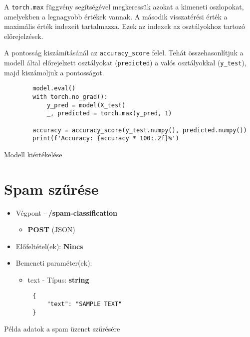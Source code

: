 \newpage
\begin{flushleft}
    A \verb|torch.max| függvény segítségével megkeressük azokat a kimeneti oszlopokat, amelyekben a legnagyobb értékek vannak. A második visszatérési érték a maximális érték indexeit tartalmazza. Ezek az indexek az osztályokhoz tartozó előrejelzések.
\end{flushleft}
\begin{flushleft}
    A pontosság kiszámításánál az \verb|accuracy_score| felel. Tehát összehasonlítjuk a modell által előrejelzett osztályokat (\verb|predicted|) a valós osztályokkal (\verb|y_test|), majd kiszámoljuk a pontosságot.
\end{flushleft}
\begin{listing}[H]
    \begin{verbatim}
        model.eval()
        with torch.no_grad():
            y_pred = model(X_test)
            _, predicted = torch.max(y_pred, 1)

        accuracy = accuracy_score(y_test.numpy(), predicted.numpy())
        print(f'Accuracy: {accuracy * 100:.2f}%')
    \end{verbatim}
    \caption{Modell kiértékelése}
    \label{code:eval}
\end{listing}

\section{Spam szűrése}
\begin{itemize}
    \item Végpont - \textbf{/spam-classification}
    \begin{itemize}
        \item \textbf{POST} (JSON)
    \end{itemize}
    \item Előfeltétel(ek): \textbf{Nincs}
\end{itemize}
\begin{itemize}
    \item Bemeneti paraméter(ek):
    \begin{itemize}
        \item text - Típus: \textbf{string}
    \end{itemize}
\end{itemize}
\begin{listing}[H]
    \begin{verbatim}
        {
            "text": "SAMPLE TEXT"
        }
    \end{verbatim}
    \caption{Példa adatok a spam üzenet szűrésére}
    \label{code:spam_filtering}
\end{listing}